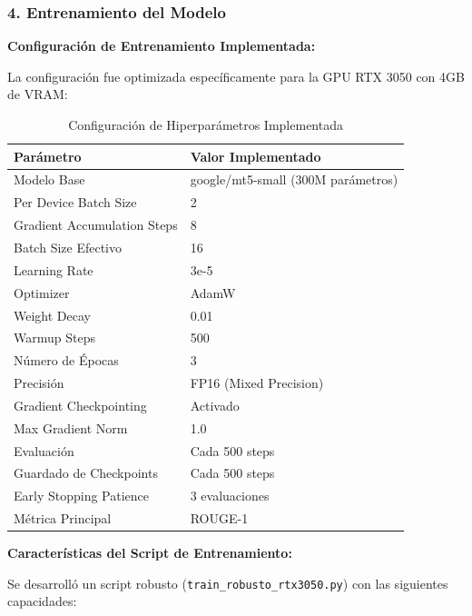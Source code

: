 \documentclass[12pt,a4paper]{article}
\begin{document}
\subsubsection{4. Entrenamiento del Modelo}

\textbf{Configuración de Entrenamiento Implementada:}

La configuración fue optimizada específicamente para la GPU RTX 3050 con 4GB de VRAM:

\begin{table}[H]
\centering
\begin{tabular}{ll}
\toprule
\textbf{Parámetro} & \textbf{Valor Implementado} \\
\midrule
Modelo Base & google/mt5-small (300M parámetros) \\
Per Device Batch Size & 2 \\
Gradient Accumulation Steps & 8 \\
Batch Size Efectivo & 16 \\
Learning Rate & 3e-5 \\
Optimizer & AdamW \\
Weight Decay & 0.01 \\
Warmup Steps & 500 \\
Número de Épocas & 3 \\
Precisión & FP16 (Mixed Precision) \\
Gradient Checkpointing & Activado \\
Max Gradient Norm & 1.0 \\
\midrule
Evaluación & Cada 500 steps \\
Guardado de Checkpoints & Cada 500 steps \\
Early Stopping Patience & 3 evaluaciones \\
Métrica Principal & ROUGE-1 \\
\bottomrule
\end{tabular}
\caption{Configuración de Hiperparámetros Implementada}
\label{tab:config_training}
\end{table}

\newpage

\textbf{Características del Script de Entrenamiento:}

Se desarrolló un script robusto (\texttt{train\_robusto\_rtx3050.py}) con las siguientes capacidades:
\end{document}
